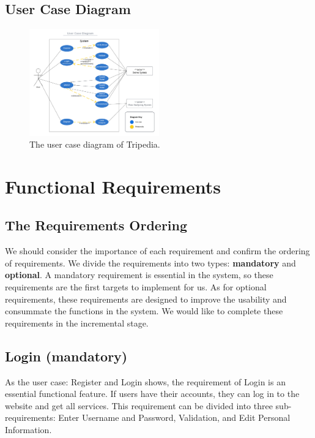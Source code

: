 \documentclass[conference]{IEEEtran}
\begin{document}
\subsection{User Case Diagram}


\begin{figure}[htbp]
\centerline{\includegraphics[width=0.5\textwidth]{UserCaseDiagram.pdf}}
\caption{The user case diagram of Tripedia.}
\label{fig2}
\end{figure}



\section{Functional Requirements}

\subsection{ The Requirements Ordering }

We should consider the importance of each requirement and confirm the ordering of requirements.
We divide the requirements into two types: \textbf{mandatory} and \textbf{optional}. A mandatory requirement 
is essential in the system, so these requirements are the first targets to implement for us.
As for optional requirements, these requirements are designed to improve the usability and consummate
the functions in the system. We would like to complete these requirements in the incremental stage.


\subsection{ Login (mandatory)}

As the user case: Register and Login shows, the requirement of Login is an essential functional feature. If users have their accounts, they can log in to the website and get all services. This requirement can be divided into three sub-requirements: 
Enter Username and Password, Validation, and Edit Personal Information.
\end{document}
